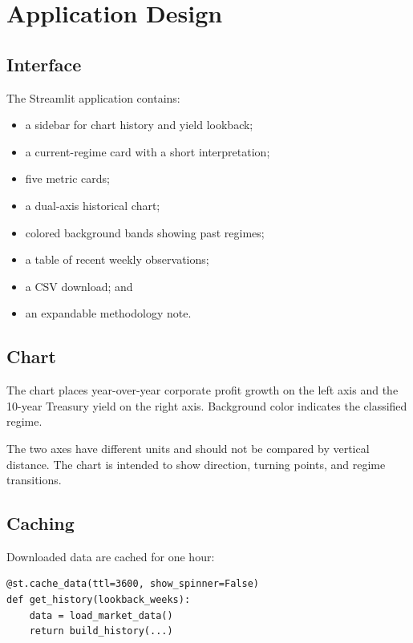 \documentclass[11pt]{article}
\begin{document}
\section{Application Design}

\subsection{Interface}

The Streamlit application contains:

\begin{itemize}
  \item a sidebar for chart history and yield lookback;
  \item a current-regime card with a short interpretation;
  \item five metric cards;
  \item a dual-axis historical chart;
  \item colored background bands showing past regimes;
  \item a table of recent weekly observations;
  \item a CSV download; and
  \item an expandable methodology note.
\end{itemize}

\subsection{Chart}

The chart places year-over-year corporate profit growth on the left axis and
the 10-year Treasury yield on the right axis. Background color indicates the
classified regime.

The two axes have different units and should not be compared by vertical
distance. The chart is intended to show direction, turning points, and regime
transitions.

\subsection{Caching}

Downloaded data are cached for one hour:

\begin{lstlisting}[style=code]
@st.cache_data(ttl=3600, show_spinner=False)
def get_history(lookback_weeks):
    data = load_market_data()
    return build_history(...)
\end{lstlisting}
\end{document}
